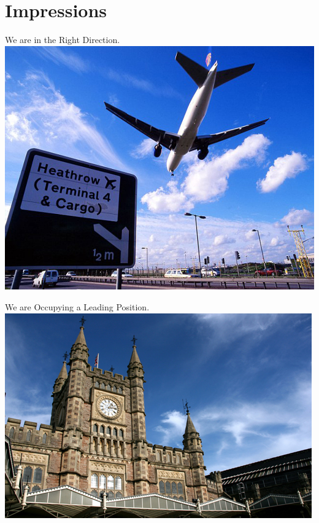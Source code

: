 \documentclass[10pt]{beamer}
\begin{document}
\section{Impressions}
\begin{frame}{We are in the Right Direction.}
    \centering
    \includegraphics[width=\textwidth, height = 0.9\textheight]{Figures/Heathrow.jpg}
\end{frame}

\begin{frame}{We are Occupying a Leading Position.}
    \centering
    \includegraphics[width=\textwidth, height = 0.9\textheight]{Figures/Bristol.jpg}
\end{frame}
\end{document}
